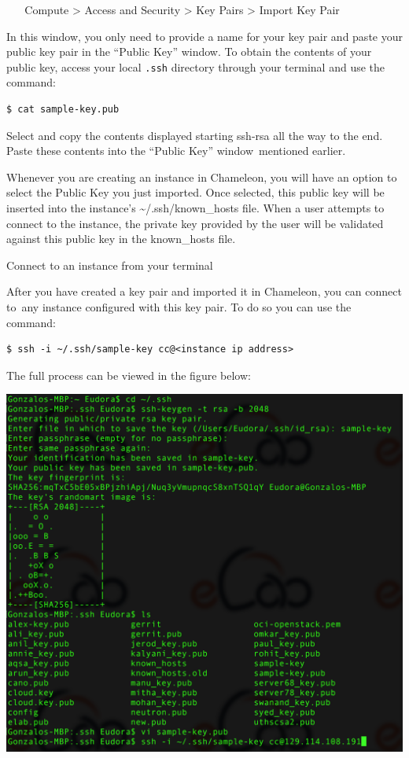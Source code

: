 ~ ~ Compute \textgreater{} Access and Security \textgreater{} Key Pairs
\textgreater{} Import Key Pair

In this window, you only need to provide a name for your key pair and
paste your public key pair in the ``Public Key'' window. To obtain the
contents of your public key, access your local \texttt{.ssh} directory
through your terminal and use the command:

\begin{verbatim}
$ cat sample-key.pub
\end{verbatim}

Select and copy the contents displayed starting ssh-rsa all the way to
the end. Paste these contents into the ``Public Key'' window~mentioned
earlier.

Whenever you are creating an instance in Chameleon, you will have an
option to select the Public Key you just imported. Once selected, this
public key will be inserted into the instance's
\textasciitilde{}/.ssh/known\_hosts file. When a user attempts to
connect to the instance, the private key provided by the user will be
validated against this public key in the known\_hosts file.

Connect to an instance from your terminal

After you have created a key pair and imported it in
Chameleon, you can connect to~any instance configured with this key
pair. To do so you can use the
command:

\begin{verbatim}
$ ssh -i ~/.ssh/sample-key cc@<instance ip address>
\end{verbatim}

The full process can be viewed in the figure below:

{\includegraphics[width=\columnwidth]{images/chameleon/ssh1.png}}

